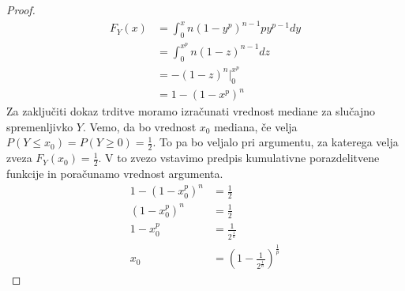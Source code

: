\documentclass[12pt,a4paper,twoside]{article}
\theoremstyle{definition} %
\theoremstyle{plain} %
\newtheorem{trditev}[definicija]{Trditev}
\numberwithin{equation}{section}  %
\begin{document}
\begin{proof}
	\begin{align*}
		F_Y(x) & = \int_0^x n(1 - y^p)^{n-1} p y^{p-1} dy \\
		& = \int_0^{x^p} n(1-z)^{n-1} dz \\
		& = -(1 - z)^n \Big|_0^{x^p} \\
		& = 1 - (1 - x^p)^n
	\end{align*}
	Za zaključiti dokaz trditve moramo izračunati vrednost mediane za slučajno spremenljivko $Y$.
	Vemo, da bo vrednost $x_0$ mediana, če velja $P(Y \leq x_0) = P(Y \geq 0) = \frac{1}{2}$.
	To pa bo veljalo pri argumentu, za katerega velja zveza $F_Y(x_0) = \frac{1}{2}$.
	V to zvezo vstavimo predpis kumulativne porazdelitvene funkcije in poračunamo vrednost argumenta.
	\begin{align*}
		1 - (1 - x_0^p)^n & = \frac{1}{2} \\
		(1 - x_0^p)^n & = \frac{1}{2} \\
		1 - x_0^p & = \frac{1}{2^{\frac{1}{n}}} \\
		x_0 & = (1 - \frac{1}{2^{\frac{1}{n}}})^{\frac{1}{p}}
	\end{align*}
\end{proof}





\end{document}
